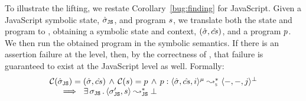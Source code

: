 To illustrate the lifting, we restate Corollary~\ref{bug:finding} for JavaScript.
Given a JavaScript symbolic state, $\hat{\sigma}_{\mathtt{JS}}$, and program $s$, we translate 
both the state and program to \jsil, obtaining a \jsil symbolic state and context, $(\hat{\sigma}, \hat{cs})$,
and a \jsil program $p$.  
We then run the obtained \jsil program in the symbolic semantics. 
If there is an assertion failure at the \jsil level, then, by the correctness of \JSComp, 
that failure is guaranteed to exist at the JavaScript level as well. Formally: 
$$
\begin{array}{l}
\compile(\sstate_\jssubscript) = (\sstate, \scs) \, \wedge \, \compile(\jstmt) = \prog \, \wedge \, 
  \prog :  \transabssemrule{\sstate, \scs, i}{-, -, j}{\mode}{\bot}{\symbolic}  \\ \quad 
      \ \implies \ \exists \, \jstate_\jssubscript \, . \, \transjssemrulebug{\jstate_\jssubscript', \jstmt}
\end{array}
$$



 
%
%
%
%
%
%
%


